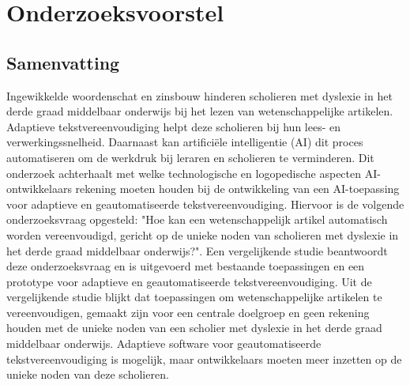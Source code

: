 \documentclass[dutch,dit,thesis]{hogentreport}
\begin{document}





%
%




\appendix

\chapter{Onderzoeksvoorstel}

\section*{Samenvatting}

Ingewikkelde woordenschat en zinsbouw hinderen scholieren met dyslexie in het derde graad middelbaar onderwijs bij het lezen van wetenschappelijke artikelen. Adaptieve tekstvereenvoudiging helpt deze scholieren bij hun lees- en verwerkingssnelheid. Daarnaast kan artificiële intelligentie (AI) dit proces automatiseren om de werkdruk bij leraren en scholieren te verminderen. Dit onderzoek achterhaalt met welke technologische en logopedische aspecten AI-ontwikkelaars rekening moeten houden bij de ontwikkeling van een AI-toepassing voor adaptieve en geautomatiseerde tekstvereenvoudiging. Hiervoor is de volgende onderzoeksvraag opgesteld: "Hoe kan een wetenschappelijk artikel automatisch worden vereenvoudigd, gericht op de unieke noden van scholieren met dyslexie in het derde graad middelbaar onderwijs?". Een vergelijkende studie beantwoordt deze onderzoeksvraag en is uitgevoerd met bestaande toepassingen en een prototype voor adaptieve en geautomatiseerde tekstvereenvoudiging. Uit de vergelijkende studie blijkt dat toepassingen om wetenschappelijke artikelen te vereenvoudigen, gemaakt zijn voor een centrale doelgroep en geen rekening houden met de unieke noden van een scholier met dyslexie in het derde graad middelbaar onderwijs. Adaptieve software voor geautomatiseerde tekstvereenvoudiging is mogelijk, maar ontwikkelaars moeten meer inzetten op de unieke noden van deze scholieren. 



%


\backmatter{}

\setlength\bibitemsep{2pt} %
\printbibliography[heading=bibintoc]
\end{document}
